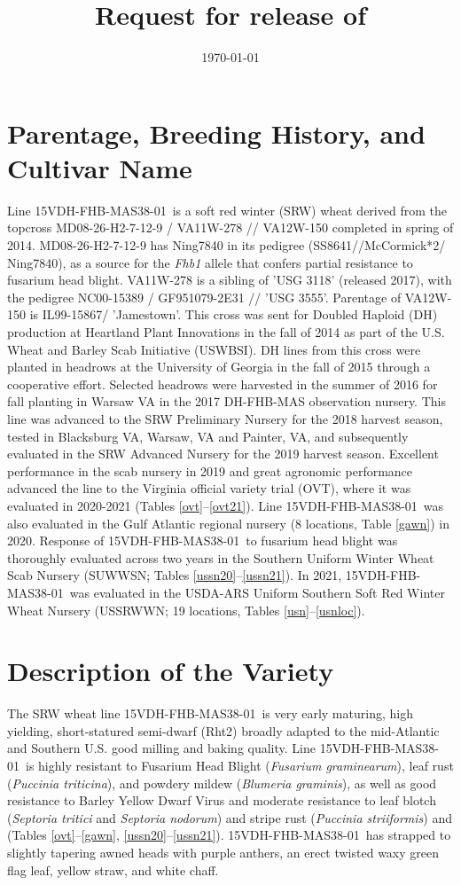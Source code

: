 \documentclass[12pt, letterpaper]{article}
\title{Request for release of \lin}
\date{\today}
\newcommand{\lin}{15VDH-FHB-MAS38-01~}
\begin{document}
\maketitle

\section{Parentage, Breeding History, and Cultivar Name}

Line \lin is a soft red winter (SRW) wheat derived from the topcross MD08-26-H2-7-12-9 / VA11W-278 // VA12W-150 completed in spring of 2014. MD08-26-H2-7-12-9 has Ning7840 in its pedigree (SS8641//McCormick*2/ Ning7840), as a source for the \textit{Fhb1} allele that confers partial resistance to fusarium head blight. VA11W-278 is a sibling of 'USG 3118' (released 2017), with the pedigree NC00-15389 / GF951079-2E31 // 'USG 3555'. Parentage of VA12W-150 is IL99-15867/ 'Jamestown'. This cross was sent for Doubled Haploid (DH) production at Heartland Plant Innovations in the fall of 2014 as part of the U.S. Wheat and Barley Scab Initiative (USWBSI). DH lines from this cross were planted in headrows at the University of Georgia in the fall of 2015 through a cooperative effort. Selected headrows were harvested in the summer of 2016 for fall planting in Warsaw VA in the 2017 DH-FHB-MAS observation nursery. This line was advanced to the SRW Preliminary Nursery for the 2018 harvest season, tested in Blacksburg VA, Warsaw, VA and Painter, VA, and subsequently evaluated in the SRW Advanced Nursery for the 2019 harvest season. Excellent performance in the scab nursery in 2019 and great agronomic performance advanced the line to the Virginia official variety trial (OVT), where it was evaluated in 2020-2021 (Tables \ref{ovt}--\ref{ovt21}). Line \lin was also evaluated in the Gulf Atlantic regional nursery (8 locations, Table \ref{gawn}) in 2020. Response of \lin to fusarium head blight was thoroughly evaluated across two years in the Southern Uniform Winter Wheat Scab Nursery (SUWWSN; Tables \ref{ussn20}--\ref{ussn21}). In 2021, \lin was evaluated in the USDA-ARS Uniform Southern Soft Red Winter Wheat Nursery (USSRWWN; 19 locations, Tables \ref{usn}--\ref{usnloc}). 

\section{Description of the Variety}

The SRW wheat line \lin is very early maturing, high yielding, short-statured semi-dwarf (Rht2) broadly adapted to the mid-Atlantic and Southern U.S.  good milling and baking quality. Line \lin is highly resistant to Fusarium Head Blight (\textit{Fusarium graminearum}), leaf rust (\textit{Puccinia triticina}), and powdery mildew (\textit{Blumeria graminis}), as well as good resistance to Barley Yellow Dwarf Virus and moderate resistance to leaf blotch (\textit{Septoria tritici} and \textit{Septoria nodorum}) and stripe rust (\textit{Puccinia striiformis}) and  (Tables \ref{ovt}--\ref{gawn}, \ref{ussn20}--\ref{ussn21}). \lin has strapped to slightly tapering awned heads with purple anthers, an erect twisted waxy green flag leaf, yellow straw, and white chaff.
\end{document}
